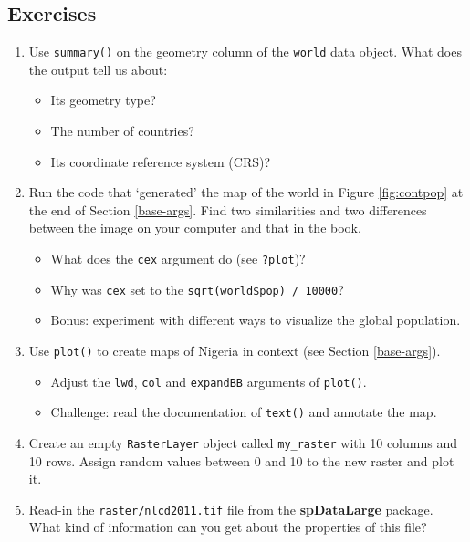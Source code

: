 \documentclass[]{krantz}
\providecommand{\tightlist}{%
  \setlength{\itemsep}{0pt}\setlength{\parskip}{0pt}}
\begin{document}
\hypertarget{ex2}{%
\subsection{Exercises}\label{ex2}}

\begin{enumerate}
\def\labelenumi{\arabic{enumi}.}
\tightlist
\item
  Use \texttt{summary()} on the geometry column of the \texttt{world} data object. What does the output tell us about:

  \begin{itemize}
  \tightlist
  \item
    Its geometry type?
  \item
    The number of countries?
  \item
    Its coordinate reference system (CRS)?
  \end{itemize}
\item
  Run the code that `generated' the map of the world in Figure \ref{fig:contpop} at the end of Section \ref{base-args}.
  Find two similarities and two differences between the image on your computer and that in the book.

  \begin{itemize}
  \tightlist
  \item
    What does the \texttt{cex} argument do (see \texttt{?plot})?
  \item
    Why was \texttt{cex} set to the \texttt{sqrt(world\$pop)\ /\ 10000}?
  \item
    Bonus: experiment with different ways to visualize the global population.
  \end{itemize}
\item
  Use \texttt{plot()} to create maps of Nigeria in context (see Section \ref{base-args}).

  \begin{itemize}
  \tightlist
  \item
    Adjust the \texttt{lwd}, \texttt{col} and \texttt{expandBB} arguments of \texttt{plot()}.
  \item
    Challenge: read the documentation of \texttt{text()} and annotate the map.
  \end{itemize}
\item
  Create an empty \texttt{RasterLayer} object called \texttt{my\_raster} with 10 columns and 10 rows.
  Assign random values between 0 and 10 to the new raster and plot it.
\item
  Read-in the \texttt{raster/nlcd2011.tif} file from the \textbf{spDataLarge} package.
  What kind of information can you get about the properties of this file?
\end{enumerate}
\end{document}
